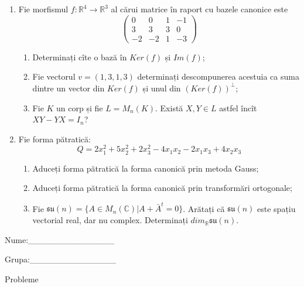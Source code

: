 \documentclass{article}
\begin{document}
\begin{enumerate}
 \item Fie morfismul $f:\mathbb{R}^4 \to \mathbb{R}^3$ al cărui matrice în raport cu bazele canonice este
$$\begin{pmatrix}
0&0&1&-1\\
3&3&3&0\\
-2&-2&1&-3
\end{pmatrix}$$

\begin{enumerate}
\item Determinați cîte o bază în $Ker(f)$ și $Im(f)$;
\item Fie vectorul $v=(1,3,1,3)$ determinați descompunerea acestuia ca suma dintre un vector din $Ker(f)$ și unul din $(Ker(f))^\perp$;
\item Fie $K$ un corp și fie $L=M_n(K)$. Există $X,Y \in L$ astfel încît $XY-YX=I_n$?  
\end{enumerate}
\item Fie forma pătratică:
$$Q= 2x_1^2+5x_2^2+2x_3^2-4x_1x_2-2x_1x_3+4x_2x_3$$

\begin{enumerate}
\item Aduceți forma pătratică la forma canonică prin metoda Gauss;
\item Aduceți forma pătratică la forma canonică prin transformări ortogonale;
\item Fie $\mathfrak{su}(n)=\{ A \in M_n(\mathbb{C}) | A+\bar{A}^t=0\}$. Arătați că $\mathfrak{su}(n)$ este spațiu vectorial real, dar nu complex.
Determinați $dim_{\mathbb{R}}\mathfrak{su}(n)$.
\end{enumerate}
\end{enumerate}
\newpage
\begin{flushright}
Nume:\_\_\_\_\_\_\_\_\_\_\_\_\_\_
 
 
Grupa:\_\_\_\_\_\_\_\_\_\_\_\_\_\_
\end{flushright}
\begin{center}
\vspace{2cm}
{\Large Probleme}
\vspace{2cm}
\end{center}
\end{document}
